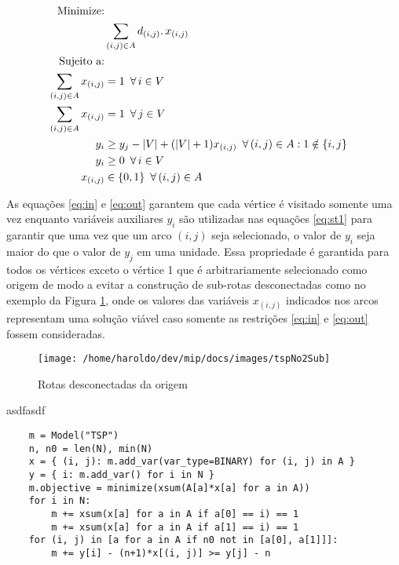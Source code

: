 \documentclass[a4paper,11pt,fleqn]{article}
\begin{document}
\begin{align}
\textrm{Minimize:}\nonumber \\
 & \sum_{(i,j)\in A}d_{(i,j)}\ldotp x_{(i,j)}\nonumber \\
\textrm{Sujeito a:}\nonumber \\
\sum_{(i,j)\in A}x_{(i,j)} & =1\,\,\,\forall\,i\in V\label{eq:in}\\
\sum_{(i,j)\in A}x_{(i,j)} & =1\,\,\,\forall\,j\in V\label{eq:out}\\
y_{i} & \geq y_{j}-|V|+(|V|+1)x_{(i,j)}\,\,\,\forall\,(i,j)\in A:1\notin\{i,j\}\label{eq:st1}\\
y_{i} & \geq0\,\,\,\forall\,i\in V\label{eq:y}\\
x_{(i,j)} & \in\{0,1\}\,\,\,\forall\,(i,j)\in A\label{eq:x}
\end{align}

As equações \ref{eq:in} e \ref{eq:out} garantem que cada vértice
é visitado somente uma vez enquanto variáveis auxiliares $y_{i}$
são utilizadas nas equações \ref{eq:st1} para garantir que uma vez
que um arco $(i,j)$ seja selecionado, o valor de $y_{i}$ seja maior
do que o valor de $y_{j}$ em uma unidade. Essa propriedade é garantida
para todos os vértices exceto o vértice 1 que é arbitrariamente selecionado
como origem de modo a evitar a construção de sub-rotas desconectadas
como no exemplo da Figura \ref{figSub}, onde os valores das variáveis
$x_{(i,j)}$ indicados nos arcos representam uma solução viável caso
somente as restrições \ref{eq:in} e \ref{eq:out} fossem consideradas.

\begin{figure}
\begin{centering}
\texttt{[image: /home/haroldo/dev/mip/docs/images/tspNo2Sub]}
\par\end{centering}
\caption{Rotas desconectadas da origem}
\label{figSub}

\end{figure}

asdfasdf

\begin{verbatim}
    m = Model("TSP")
    n, n0 = len(N), min(N)
    x = { (i, j): m.add_var(var_type=BINARY) for (i, j) in A }
    y = { i: m.add_var() for i in N }
    m.objective = minimize(xsum(A[a]*x[a] for a in A))
    for i in N:
        m += xsum(x[a] for a in A if a[0] == i) == 1
        m += xsum(x[a] for a in A if a[1] == i) == 1
    for (i, j) in [a for a in A if n0 not in [a[0], a[1]]]:
        m += y[i] - (n+1)*x[(i, j)] >= y[j] - n
\end{verbatim}
\end{document}
